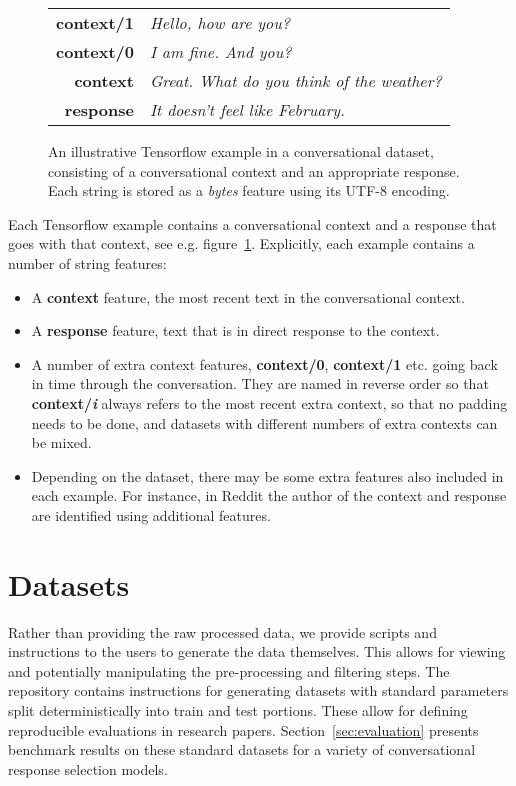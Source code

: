 \documentclass[11pt,a4paper,table]{article}
\begin{document}
\begin{figure}[htb]
    \centering
    {\small
        \begin{tabular}{>{\bfseries}r >{\itshape}l}
          context/1 & Hello, how are you? \\
          context/0& I am fine. And you? \\
          context & Great. What do you think of the weather? \\
          response & It doesn't feel like February. \\
        \end{tabular}
    }
    
    \caption{
        \label{fig:example}
        An illustrative Tensorflow example in a conversational dataset, consisting of a conversational context and an appropriate response. Each string is stored as a \emph{bytes} feature using its UTF-8 encoding.
    }

\end{figure}

Each Tensorflow example contains a conversational context and a response that goes with that context, see e.g. figure~\ref{fig:example}. Explicitly, each example contains a number of string features:

\begin{itemize}
  \setlength\itemsep{0.1em}
\item A \textbf{context} feature, the most recent text in the conversational context.
\item A \textbf{response} feature, text that is in direct response to the context.
\item A number of extra context features, \textbf{context/0}, \textbf{context/1} etc. going back in time through the conversation. They are named in reverse order so that \textbf{context/\emph{i}} always refers to the  most recent extra context, so that no padding needs to be done, and datasets with different numbers of extra contexts can be mixed.
\item Depending on the dataset, there may be some extra features also included in each example. For instance, in Reddit the author of the context and response are identified using additional features.
\end{itemize}

\section{Datasets}
\label{sec:datasets}

Rather than providing the raw processed data, we provide scripts and instructions to the users to generate the data themselves. This allows for viewing and potentially manipulating the pre-processing and filtering steps. The repository contains instructions for generating datasets with standard parameters split deterministically into train and test portions. These allow for defining reproducible evaluations in research papers. Section~\ref{sec:evaluation} presents benchmark results on these standard datasets for a variety of conversational response selection models.
\end{document}
